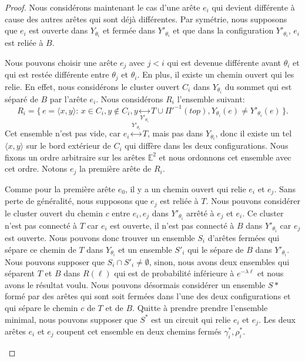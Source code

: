 \documentclass[titlepage,a4paper,12pt]{article}
\begin{document}
\begin{proof}
Nous considérons maintenant le cas d'une arête $e_i$ qui devient différente à cause des autres arêtes qui sont déjà différentes. Par symétrie, nous supposons que $e_i$ est ouverte dans $Y_{\theta_i}$ et fermée dans $Y'_{\theta_i}$ et que dans la configuration $Y'_{\theta_i}$, $e_i$ est reliée à $B$.

Nous pouvons choisir une arête $e_j$ avec $j< i$ qui est devenue différente avant $\theta_i$ et qui est restée différente entre $\theta_j$ et $\theta_i$. En plus, il existe un chemin ouvert qui les relie. En effet, nous considérons le cluster ouvert $C_i$ dans $Y_{\theta_i}$ du sommet qui est séparé de $B$ par l'arête $e_i$. Nous considérons $R_i$ l'ensemble suivant:
$$ R_i = \big\{ \, e = \langle x,y\rangle:\, x\in C_i, y\notin C_i, y\underset{Y'_{\theta_i}}{\leftrightarrow} T\cup \Pi'^{-1}(top), Y_{\theta_i}(e)\neq Y'_{\theta_i}(e) \,\big\}.
$$
Cet ensemble n'est pas vide, car $e_i\overset{Y'_{\theta_i}}{\leftrightarrow} T$, mais pas dans $Y_{\theta_i}$, donc il existe un tel $\langle x,y\rangle$ sur le bord extérieur de $C_i$ qui diffère dans les deux configurations. Nous fixons un ordre arbitraire sur les arêtes $\mathbb{E}^2$ et nous ordonnons cet ensemble avec cet ordre. Notons $e_j$ la première arête de $R_i$.

Comme pour la première arête $e_0$, il y a un chemin ouvert qui relie $e_i$ et $e_j$. Sans perte de généralité, nous supposons que $e_j$ est reliée à $T$.
Nous pouvons considérer le cluster ouvert du chemin $c$ entre $e_i,e_j$ dans $Y'_{\theta_i}$ arrêté à $e_j$ et $e_i$. Ce cluster n'est pas connecté à $T$ car $e_i$ est ouverte, il n'est pas connecté à $B$ dans $Y'_{\theta_i}$ car $e_j$ est ouverte. Nous pouvons donc trouver un ensemble $S_i$ d'arêtes fermées qui sépare ce chemin de $T$ dans $Y_{\theta_i}$ et un ensemble $S'_i$ qui le sépare de $B$ dans $Y'_{\theta_i}$. Nous pouvons supposer que $S_i\cap S'_i \neq \emptyset$, sinon, nous avons deux ensembles qui séparent $T$ et $B$ dans $R(\ell)$ qui est de probabilité inférieure à $e^{-\lambda \ell}$ et nous avons le résultat voulu. Nous pouvons désormais considérer un ensemble $S*$ formé par des arêtes qui sont soit fermées dans l'une des deux configurations et qui sépare le chemin $c$ de $T$ et de $B$. Quitte à prendre prendre l'ensemble minimal, nous pouvons supposer que $S^*$ est un circuit qui relie $e_i$ et $e_j$. Les deux arêtes $e_i$ et $e_j$ coupent cet ensemble en deux chemins fermés $\gamma_i^*, \rho_i^*$.
\begin{figure}[h]


\end{figure}
\end{proof}
\end{document}
